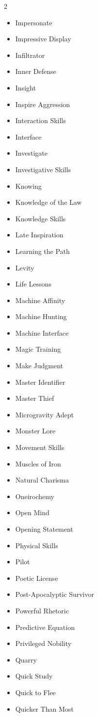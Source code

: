 \begin{multicols}{2}
\begin{itemize}
\item Impersonate
\item Impressive Display
\item Infiltrator
\item Inner Defense
\item Insight
\item Inspire Aggression
\item Interaction Skills
\item Interface
\item Investigate
\item Investigative Skills
\item Knowing
\item Knowledge of the Law
\item Knowledge Skills
\item Late Inspiration
\item Learning the Path
\item Levity
\item Life Lessons
\item Machine Affinity
\item Machine Hunting
\item Machine Interface
\item Magic Training
\item Make Judgment
\item Master Identifier
\item Master Thief
\item Microgravity Adept
\item Monster Lore
\item Movement Skills
\item Muscles of Iron
\item Natural Charisma
\item Oneirochemy
\item Open Mind
\item Opening Statement
\item Physical Skills
\item Pilot
\item Poetic License
\item Post-Apocalyptic Survivor
\item Powerful Rhetoric
\item Predictive Equation
\item Privileged Nobility
\item Quarry
\item Quick Study
\item Quick to Flee
\item Quicker Than Most

\end{itemize}
\end{multicols}
